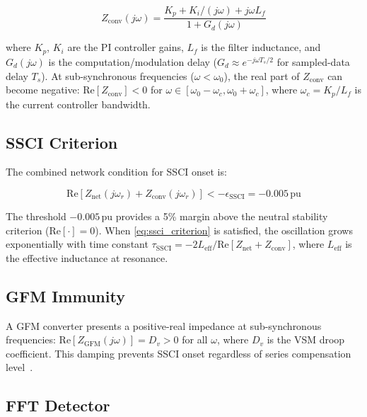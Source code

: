\documentclass[11pt, a4paper]{article}
\newcommand{\pu}{\,\text{pu}}
\begin{document}
\begin{equation}
  Z_{\mathrm{conv}}(j\omega) = \frac{K_p + K_i/(j\omega) + j\omega L_f}{1 + G_d(j\omega)}
  \label{eq:zconv}
\end{equation}

\noindent where $K_p$, $K_i$ are the PI controller gains, $L_f$ is the filter
inductance, and $G_d(j\omega)$ is the computation/modulation delay
($G_d \approx e^{-j\omega T_s/2}$ for sampled-data delay $T_s$).
At sub-synchronous frequencies ($\omega < \omega_0$), the real part of
$Z_{\mathrm{conv}}$ can become negative:
$\mathrm{Re}[Z_{\mathrm{conv}}] < 0$ for
$\omega \in [\omega_0 - \omega_c, \omega_0 + \omega_c]$,
where $\omega_c = K_p/L_f$ is the current controller bandwidth.

\subsection{SSCI Criterion}

The combined network condition for SSCI onset is:

\begin{equation}
  \mathrm{Re}[Z_{\mathrm{net}}(j\omega_r) + Z_{\mathrm{conv}}(j\omega_r)]
    < -\epsilon_{\mathrm{SSCI}} = -0.005\pu
  \label{eq:ssci_criterion}
\end{equation}

\noindent The threshold $-0.005\pu$ provides a 5\% margin above the neutral
stability criterion ($\mathrm{Re}[\cdot] = 0$). When \eqref{eq:ssci_criterion}
is satisfied, the oscillation grows exponentially with time constant
$\tau_{\mathrm{SSCI}} = -2L_{\mathrm{eff}} /
\mathrm{Re}[Z_{\mathrm{net}} + Z_{\mathrm{conv}}]$,
where $L_{\mathrm{eff}}$ is the effective inductance at resonance.

\subsection{GFM Immunity}

A GFM converter presents a positive-real impedance at sub-synchronous frequencies:
$\mathrm{Re}[Z_{\mathrm{GFM}}(j\omega)] = D_v > 0$ for all $\omega$,
where $D_v$ is the VSM droop coefficient. This damping prevents SSCI onset
regardless of series compensation level~\cite{Wen2015}.

\subsection{FFT Detector}
\end{document}
